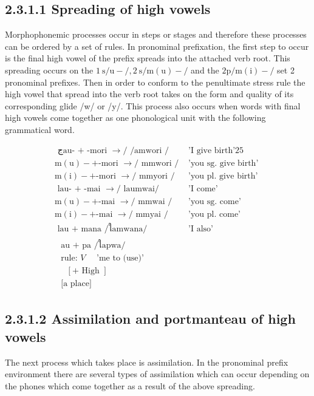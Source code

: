 \documentclass[10pt]{article}
\begin{document}
\subsection*{2.3.1.1 Spreading of high vowels}
Morphophonemic processes occur in steps or stages and therefore these processes can be ordered by a set of rules. In pronominal prefixation, the first step to occur is the final high vowel of the prefix spreads into the attached verb root. This spreading occurs on the \(1 \mathrm{~s} / \mathrm{u}-/, 2 \mathrm{~s} / \mathrm{m}(\mathrm{u})-/\) and the \(2 \mathrm{p} / \mathrm{m}(\mathrm{i})-/\) set 2 pronominal prefixes. Then in order to conform to the penultimate stress rule the high vowel that spread into the verb root takes on the form and quality of its corresponding glide /w/ or /y/. This process also occurs when words with final high vowels come together as one phonological unit with the following grammatical word.

\[
\begin{array}{ll}
\text { جau- + -mori } \rightarrow / \text { /amwori } / & \text { 'I give birth'25 } \\
\mathrm{m}(\mathrm{u})-+ \text {-mori } \rightarrow / \text { mmwori } / & \text { 'you sg. give birth' } \\
\mathrm{m}(\mathrm{i})-+ \text {-mori } \rightarrow / \text { mmyori } / & \text { 'you pl. give birth' } \\
\text { lau- + -mai } \rightarrow / \text { laumwai/ } & \text { 'I come' } \\
\mathrm{m}(\mathrm{u})-+ \text {-mai } \rightarrow / \text { mmwai } / & \text { 'you sg. come' } \\
\mathrm{m}(\mathrm{i})-+ \text {-mai } \rightarrow / \text { mmyai } / & \text { 'you pl. come' } \\
\text { lau + mana /ใamwana/ } & \text { 'I also' } \\
\begin{array}{l}
\text { au + pa /ใapwa/ } \\
\text { rule: } V \quad \text { 'me to (use)' } \\
\quad[+ \text { High }] \\
\text { [a place] }
\end{array} &
\end{array}
\]

\subsection*{2.3.1.2 Assimilation and portmanteau of high vowels}
The next process which takes place is assimilation. In the pronominal prefix environment there are several types of assimilation which can occur depending on the phones which come together as a result of the above spreading.
\end{document}
